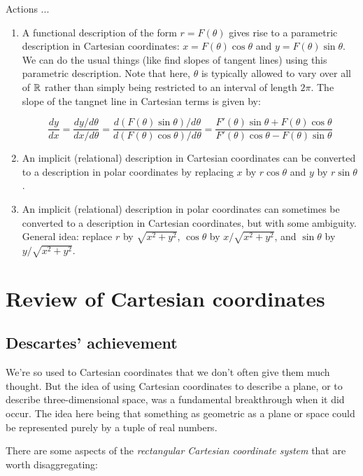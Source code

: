 \documentclass[10pt]{amsart}
\begin{document}
Actions ...

\begin{enumerate}
\item A functional description of the form $r = F(\theta)$ gives rise
  to a parametric description in Cartesian coordinates: $x =
  F(\theta)\cos \theta$ and $y = F(\theta)\sin \theta$. We can do the
  usual things (like find slopes of tangent lines) using this
  parametric description. Note that here, $\theta$ is typically
  allowed to vary over all of $\mathbb{R}$ rather than simply being restricted
  to an interval of length $2\pi$. The slope of the tangnet line in
  Cartesian terms is given by:

$$\frac{dy}{dx} = \frac{dy/d\theta}{dx/d\theta} = \frac{d(F(\theta)\sin \theta)/d\theta}{d(F(\theta)\cos \theta)/d\theta} = \frac{F'(\theta)\sin \theta + F(\theta)\cos \theta}{F'(\theta) \cos \theta - F(\theta)\sin \theta}$$

\item An implicit (relational) description in Cartesian coordinates
  can be converted to a description in polar coordinates by replacing
  $x$ by $r\cos \theta$ and $y$ by $r\sin \theta$.
\item An implicit (relational) description in polar coordinates can
  sometimes be converted to a description in Cartesian coordinates,
  but with some ambiguity. General idea: replace $r$ by $\sqrt{x^2 +
  y^2}$, $\cos \theta$ by $x/\sqrt{x^2 + y^2}$, and $\sin \theta$ by
  $y/\sqrt{x^2 + y^2}$.
\end{enumerate}
\section{Review of Cartesian coordinates}

\subsection{Descartes' achievement}

We're so used to Cartesian coordinates that we don't often give them
much thought. But the idea of using Cartesian coordinates to describe
a plane, or to describe three-dimensional space, was a fundamental
breakthrough when it did occur. The idea here being that something as
geometric as a plane or space could be represented purely by a tuple
of real numbers.

There are some aspects of the {\em rectangular Cartesian coordinate
system} that are worth disaggregating:
\end{document}
